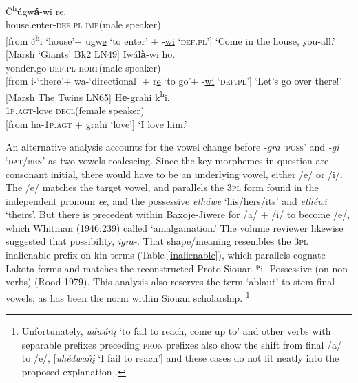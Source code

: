 \documentclass[output=paper]{LSP/langsci}
\begin{document}
\begin{exe}
\ex \gll \v{C}\textsuperscript{h}\'ugw\textbf{\'a}-wi    re. \\
house.enter-\textsc{def.pl}  \textsc{imp}(male speaker) \\

[from \v{c}\textsuperscript{h}i `house'+ ugw\underline{e} `to enter' + -\underline{wi} `\textsc{def.pl}']
\trans `Come in the house, you-all.'  [Marsh `Giants' Bk2 LN49]
\ex \gll Iw\'al\textbf{\`a}-wi          ho. \\
yonder.go-\textsc{def.pl} \textsc{hort}(male speaker)\\ 

[from i-`there'+ wa-`directional' + r\underline{e} `to go'+ -\underline{wi} `\textsc{def.pl}'] 		
\trans `Let's go over there!' 	[Marsh The Twins LN65]
\ex \gll  H\textbf{e}-grahi k\textsuperscript{h}i.  \\
1\textsc{p.agt}-love   \textsc{decl}(female speaker) \\

[from h\underline{a}-1\textsc{p.agt} + \underline{gra}hi `love'] 
\trans `I love him.'  
\end{exe} 

An alternative analysis accounts for the vowel change before \textit{-gra} `\textsc{poss}' and \textit{-gi} `\textsc{dat/ben}' as two vowels coalescing.  Since the key morphemes in question are consonant initial, there would have to be an underlying vowel, either /e/ or /i/.   The /e/ matches the target vowel, and parallels the \textsc{3pl} form found in the independent pronoun \textit{ee}, and the possessive \textit{eth\'awe} `his/hers/its' and \textit{eth\'ewi} `theirs'.  But there is precedent within Baxoje-Jiwere for /a/ + /i/ to become /e/, which Whitman (1946:239) called `amalgamation.'  The volume reviewer likewise suggested that possibility, \textit{igra-}.  That shape/meaning resembles the \textsc{3pl} inalienable prefix on kin terms (Table \ref{inalienable}), which parallels cognate Lakota forms and matches the reconstructed Proto-Siouan *i- Possessive (on non-verbs) (Rood 1979).  This analysis also reserves the term `ablaut' to stem-final vowels, as has been the norm within Siouan scholarship. \footnote{Unfortunately, \textit{udw\'a\~n\k{i}} `to fail to reach, come up to' and other verbs with separable prefixes preceding \textsc{pron} prefixes also show the shift from final /a/ to /e/, [\textit{uh\'edwa\~n\k{i}} `I fail to reach'] and these cases do not fit neatly into the proposed explanation \citep[240]{Whitman1946}.}
           
\end{document}
